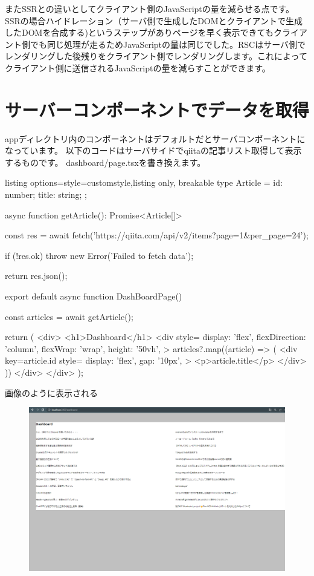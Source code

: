 またSSRとの違いとしてクライアント側のJavaScriptの量を減らせる点です。
SSRの場合ハイドレーション（サーバ側で生成したDOMとクライアントで生成したDOMを合成する)というステップがありページを早く表示できてもクライアント側でも同じ処理が走るためJavaScriptの量は同じでした。RSCはサーバ側でレンダリングした後残りをクライアント側でレンダリングします。これによってクライアント側に送信されるJavaScriptの量を減らすことができます。


\section{サーバーコンポーネントでデータを取得}


appディレクトリ内のコンポーネントはデフォルトだとサーバコンポーネントになっています。
以下のコードはサーバサイドでqiitaの記事リスト取得して表示するものです。
dashboard/page.tsxを書き換えます。



\begin{tcblisting}{listing options={style=customstyle},listing only, breakable}
  type Article = {
  id: number;
  title: string;
  };

  async function getArticle(): Promise<Article[]> {
  const res = await fetch('https://qiita.com/api/v2/items?page=1&per_page=24');

  if (!res.ok) {
      throw new Error('Failed to fetch data');
    }

  return res.json();
  }

  export default async function DashBoardPage() {
  const articles = await getArticle();

  return (
  <div>
  <h1>Dashboard</h1>
  <div
  style={{
      display: 'flex',
      flexDirection: 'column',
      flexWrap: 'wrap',
      height: '50vh',
    }}
  >
  {articles?.map((article) => (
  <div
  key={article.id}
  style={{
      display: 'flex',
      gap: '10px',
    }}
  >
    <p>{article.title}</p>
  </div>
  ))}
  </div>
  </div>
  );
  }


\end{tcblisting}






画像のように表示される

\begin{figure}[H]
  \centering
  \includegraphics[width=12cm]{./image/03-Tech/chap4/06.png}
\end{figure}



